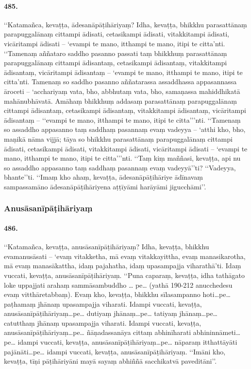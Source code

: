 \paragraph{485.} ‘‘Katamañca, kevaṭṭa, ādesanāpāṭihāriyaṃ? Idha, kevaṭṭa, bhikkhu parasattānaṃ parapuggalānaṃ cittampi ādisati, cetasikampi ādisati, vitakkitampi ādisati, vicāritampi ādisati – ‘evampi te mano, itthampi te mano, itipi te citta’nti. ‘‘Tamenaṃ aññataro saddho pasanno passati taṃ bhikkhuṃ parasattānaṃ parapuggalānaṃ cittampi ādisantaṃ, cetasikampi ādisantaṃ, vitakkitampi ādisantaṃ, vicāritampi ādisantaṃ – ‘evampi te mano, itthampi te mano, itipi te citta’nti. Tamenaṃ so saddho pasanno aññatarassa assaddhassa appasannassa āroceti – ‘acchariyaṃ vata, bho, abbhutaṃ vata, bho, samaṇassa mahiddhikatā mahānubhāvatā. Amāhaṃ bhikkhuṃ addasaṃ parasattānaṃ parapuggalānaṃ cittampi ādisantaṃ, cetasikampi ādisantaṃ, vitakkitampi ādisantaṃ, vicāritampi ādisantaṃ – ‘‘evampi te mano, itthampi te mano, itipi te citta’’’nti. ‘‘Tamenaṃ so assaddho appasanno taṃ saddhaṃ pasannaṃ evaṃ vadeyya – ‘atthi kho, bho, maṇikā nāma vijjā; tāya so bhikkhu parasattānaṃ parapuggalānaṃ cittampi ādisati, cetasikampi ādisati, vitakkitampi ādisati, vicāritampi ādisati – ‘evampi te mano, itthampi te mano, itipi te citta’’’nti. ‘‘Taṃ kiṃ maññasi, kevaṭṭa, api nu so assaddho appasanno taṃ saddhaṃ pasannaṃ evaṃ vadeyyā’’ti? ‘‘Vadeyya, bhante’’ti. ‘‘Imaṃ kho ahaṃ, kevaṭṭa, ādesanāpāṭihāriye ādīnavaṃ sampassamāno ādesanāpāṭihāriyena aṭṭīyāmi harāyāmi jigucchāmi’’.

\subsubsection{Anusāsanīpāṭihāriyaṃ}

\paragraph{486.} ‘‘Katamañca, kevaṭṭa, anusāsanīpāṭihāriyaṃ? Idha, kevaṭṭa, bhikkhu evamanusāsati – ‘evaṃ vitakketha, mā evaṃ vitakkayittha, evaṃ manasikarotha, mā evaṃ manasākattha, idaṃ pajahatha, idaṃ upasampajja viharathā’ti. Idaṃ vuccati, kevaṭṭa, anusāsanīpāṭihāriyaṃ. ‘‘Puna caparaṃ, kevaṭṭa, idha tathāgato loke uppajjati arahaṃ sammāsambuddho … pe… (yathā 190-212 anucchedesu evaṃ vitthāretabbaṃ). Evaṃ kho, kevaṭṭa, bhikkhu sīlasampanno hoti…pe… paṭhamaṃ jhānaṃ upasampajja viharati. Idampi vuccati, kevaṭṭa, anusāsanīpāṭihāriyaṃ…pe… dutiyaṃ jhānaṃ…pe… tatiyaṃ jhānaṃ…pe… catutthaṃ jhānaṃ upasampajja viharati. Idampi vuccati, kevaṭṭa, anusāsanīpāṭihāriyaṃ…pe… ñāṇadassanāya cittaṃ abhinīharati abhininnāmeti…pe… idampi vuccati, kevaṭṭa, anusāsanīpāṭihāriyaṃ…pe… nāparaṃ itthattāyāti pajānāti…pe… idampi vuccati, kevaṭṭa, anusāsanīpāṭihāriyaṃ. ‘‘Imāni kho, kevaṭṭa, tīṇi pāṭihāriyāni mayā sayaṃ abhiññā sacchikatvā paveditāni’’.

